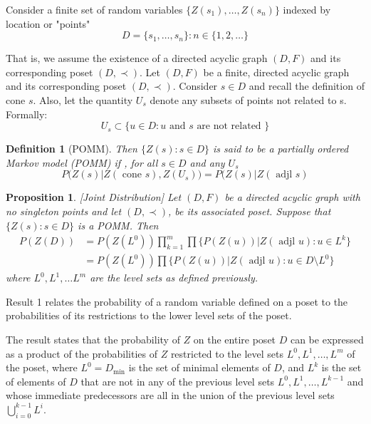 \documentclass[11pt]{amsart}
\newtheorem{proposition}{Proposition}
\newtheorem{definition}{Definition}
\begin{document}
Consider a finite set of random variables $\{ Z(s_1),\ldots,Z(s_n) \}$ indexed by location or "points" $$
D = \{s_1,\ldots ,s_n \}: n \in \{1,2,\ldots \}
$$

That is, we assume the existence of a directed acyclic graph $(D,F)$ and its corresponding poset $(D,\prec).$
Let $(D,F)$ be a finite, directed acyclic graph and its corresponding poset $(D,\prec).$ Consider $s \in D$ and recall the definition of cone $s$. Also, let the quantity $U_s$ denote any subsets of points not related to s. 
Formally:
$$
U_s \subset \{ u \in D: u \text{ and } s \text{ are not related } \}
$$
\begin{definition}[POMM]
Then $\{ Z(s): s \in D \}$ is said to be a partially ordered Markov model (POMM) if , for all $s \in D$ and any $U_s$
\begin{equation}
P(Z(s)|Z(\text{ cone } s), Z(U_s)) = P(Z(s)|Z(\text{ adjl } s)
\end{equation}
\end{definition}
\begin{proposition}\label{eq:result1}[Joint Distribution]
Let $(D,F)$ be a directed acyclic graph with no singleton points and let $(D, \prec)$, be its associated poset. Suppose that $\{Z(s): s \in D\}$ is a POMM. Then 
\begin{align}
P(Z(D)) &= P(Z(L^0)) \prod_{k=1}^m \prod \{ P(Z(u))| Z(\text{ adjl } u): u \in L^k \} \\
&= P(Z(L^0)) \prod \{ P(Z(u))| Z(\text{ adjl } u): u \in D 
\setminus L^0 \}
\end{align}
where $L^0, L^1, \ldots L^m$ are the level sets as defined previously.
\end{proposition}







Result 1 relates the probability of a random variable defined on a poset to the probabilities of its restrictions to the lower level sets of the poset.

The result states that the probability of $Z$ on the entire poset $D$ can be expressed as a product of the probabilities of $Z$ restricted to the level sets $L^0, L^1, \ldots, L^m$ of the poset, where $L^0 = D_{\text{min}}$ is the set of minimal elements of $D$, and $L^k$ is the set of elements of $D$ that are not in any of the previous level sets $L^0, L^1, \ldots, L^{k-1}$ and whose immediate predecessors are all in the union of the previous level sets $\bigcup_{i=0}^{k-1} L^i$.
\end{document}
